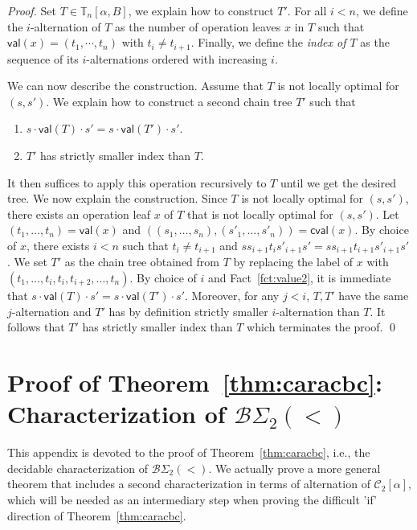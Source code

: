\documentclass[envcountsame]{llncs}
\newcommand\Cs{\ensuremath{\mathcal{C}}\xspace}
\newcommand\Cstwo{\ensuremath{\Cs_2}\xspace}
\newcommand\ct{\ensuremath{\mathbb{T}}\xspace}
\newcommand{\bswd}{\ensuremath{\mathcal{B}\Sigma_{2}(<)}\xspace}
\newcommand\val[1]{\ensuremath{\textsf{val}(#1)\xspace}}
\newcommand\cval[1]{\ensuremath{\textsf{cval}(#1)\xspace}}
\newcommand\chain{chain\xspace}
\begin{document}
\begin{proof}
  Set $T \in \ct_n[\alpha,B]$, we explain how to construct $T'$. For all
  $i < n$, we define the $i$-alternation of $T$ as the number of
  operation leaves $x$ in $T$ such that $\val{x} = (t_1,\cdots,t_{n})$
  with $t_i \neq t_{i+1}$. Finally, we define the \emph{index of $T$} as
  the sequence of its $i$-alternations ordered with increasing $i$.

  We can now describe the construction. Assume that $T$ is not locally
  optimal for $(s,s')$. We explain how to construct a second \chain tree
  $T'$ such that
  \begin{enumerate}
  \item $s \cdot \val{T} \cdot s' = s \cdot \val{T'} \cdot s'$.
  \item $T'$ has strictly smaller index than $T$.
  \end{enumerate}
  It then suffices to apply this operation recursively to $T$ until we
  get the desired tree. We now explain the construction. Since $T$ is
  not locally optimal for $(s,s')$, there exists an operation leaf $x$
  of $T$ that is not locally optimal for $(s,s')$. Let
  $(t_1,\dots,t_{n}) = \val{x}$ and
  $((s_1,\dots,s_{n}),(s'_1,\dots,s'_{n})) = \cval{x}$. By choice of
  $x$, there exists $i < n$ such that $t_i \neq t_{i+1}$ and
  $ss_{i+1}t_{i}s'_{i+1}s' = ss_{i+1}t_{i+1}s'_{i+1}s'$. We set $T'$ as 
  the \chain tree obtained from $T$ by replacing the label of $x$ with
  $(t_1,\dots,t_i,t_i,t_{i+2},\dots,t_n)$. By choice of $i$ and
  Fact~\ref{fct:value2}, it is immediate that $s \cdot \val{T} \cdot s' =
  s \cdot \val{T'} \cdot s'$. Moreover, for any $j < i$, $T,T'$ have the
  same $j$-alternation and $T'$ has by definition strictly smaller
  $i$-alternation than $T$. It follows that $T'$ has strictly smaller
  index than $T$ which terminates the proof. \qed
\end{proof} 

\section{Proof of Theorem~\ref{thm:caracbc}: Characterization of \bswd}
\label{app:bc}
This appendix is devoted to the proof of Theorem~\ref{thm:caracbc},
i.e., the decidable characterization of \bswd. We actually prove a
more general theorem that includes a second characterization in terms
of alternation of $\Cstwo[\alpha]$, which will be needed as an
intermediary step when proving the difficult 'if' direction of
Theorem~\ref{thm:caracbc}.
\end{document}
